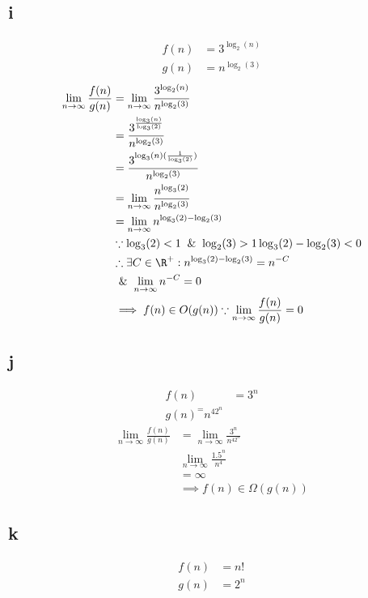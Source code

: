 \subsection*{i}
\begin{align*}
    f(n) &= 3^{\log_2(n)}\\
    g(n) &= n^{\log_2(3)}
\end{align*}
\begin{align*}
    \lim_{n \to \infty} \frac{f(n)}{g(n)} &= \lim_{n \to \infty} \frac{3^{\log_2(n)}}{n^{\log_2(3)}}\\
    &= \frac{3^{\frac{\log_3(n)}{\log_3(2)}}}{n^{\log_2(3)}}\\
    &= \frac{3^{\log_3(n) (\frac{1}{\log_3(2)})}}{n^{\log_2(3)}}\\
    &= \lim_{n \to \infty}\frac{n^{\log_3(2)}}{n^{\log_2(3)}}\\
    &= \lim_{n \to \infty} n^{\log_3(2) - \log_2(3)}\\
    &\because \log_3(2) < 1 \And \log_2(3) > 1 \log_3(2) - \log_2(3) < 0\\
    &\therefore \exists C \in \R^+: n^{\log_3(2) - \log_2(3)} =  n^{-C}\\
    &\And \lim_{n \to \infty} n^{-C} = 0\\
    &\implies f(n) \in O(g(n)) \because \lim_{n \to \infty} \frac{f(n)}{g(n)} = 0
\end{align*}

\subsection*{j}
\begin{align*}
    f(n) &= 3^n\\
    g(n) ^= n^42^n
\end{align*}
\begin{align*}
    \lim_{n \to \infty} \frac{f(n)}{g(n)} &= \lim_{n \to \infty}\frac{3^n}{n^42^n}\\
    &\lim_{n \to \infty} \frac{1.5^n}{n^4}\\
    &= \infty\\
    &\implies f(n) \in \Omega(g(n))
\end{align*}

\subsection*{k}
\begin{align*}
    f(n) &= n!\\
    g(n) &= 2^n
\end{align*}

